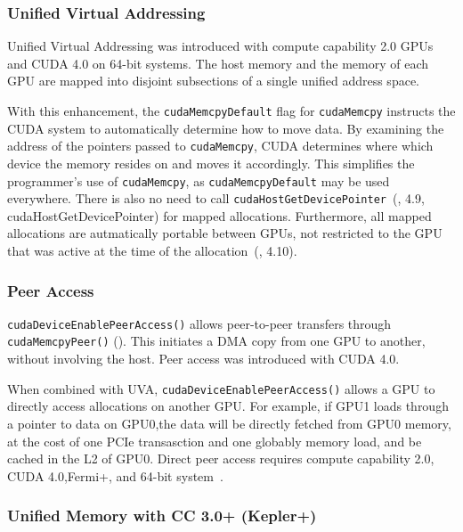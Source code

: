 \subsubsection{Unified Virtual Addressing}
\label{sec:uva}

Unified Virtual Addressing was introduced with compute capability 2.0 GPUs  and CUDA 4.0 on 64-bit systems.
The host memory and the memory of each GPU are mapped into disjoint subsections of a single unified address space.

With this enhancement, the \texttt{cudaMemcpyDefault} flag for \texttt{cudaMemcpy} instructs the CUDA system to automatically determine how to move data.
By examining the address of the pointers passed to \texttt{cudaMemcpy}, CUDA determines where which device the memory resides on and moves it accordingly.
This simplifies the programmer's use of \texttt{cudaMemcpy}, as \texttt{cudaMemcpyDefault} may be used everywhere.
There is also no need to call \texttt{cudaHostGetDevicePointer}~(\cite{nvidia2018cuda}, 4.9, cudaHostGetDevicePointer) for mapped allocations.
Furthermore, all mapped allocations are autmatically portable between GPUs, not restricted to the GPU that was active at the time of the allocation~(\cite{nvidia2018cuda}, 4.10).

\subsubsection{Peer Access}

\texttt{cudaDeviceEnablePeerAccess()} allows peer-to-peer transfers through \texttt{cudaMemcpyPeer()} ().
This initiates a DMA copy from one GPU to another, without involving the host.
Peer access was introduced with CUDA 4.0.

When combined with UVA, \texttt{cudaDeviceEnablePeerAccess()} allows a GPU to directly access allocations on another GPU.
For example, if GPU1 loads through a pointer to data on GPU0,the data will be directly fetched from GPU0 memory, at the cost of one PCIe transasction and one globably memory load, and be cached in the L2 of GPU0.
Direct peer access requires compute capability 2.0, CUDA 4.0,Fermi+, and 64-bit system~\cite{schroeder2011peer}.

\subsubsection{Unified Memory with CC 3.0+ (Kepler+)}





